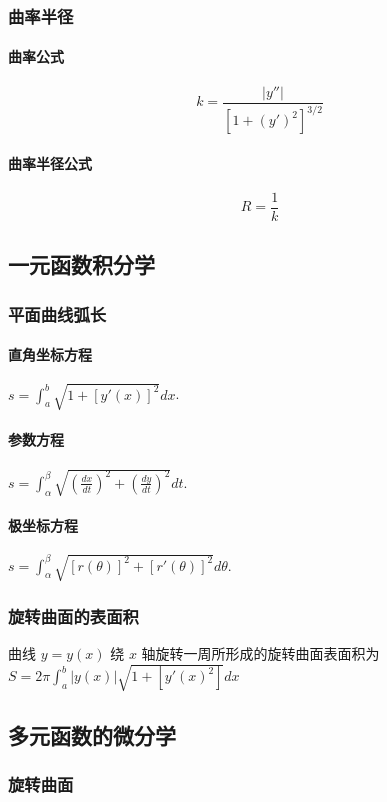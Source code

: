 ﻿\documentclass[a4paper,12pt,UTF8]{ctexart}
\begin{document}
    \subsubsection{曲率半径}
    \paragraph{曲率公式} \[k=\frac{|y''|}{[1+(y')^2]^{3/2}}\]
    \paragraph{曲率半径公式} \[R=\frac{1}{k}\]

    \subsection{一元函数积分学}

    \subsubsection{平面曲线弧长}
    \paragraph{直角坐标方程} \(s=\int_{a}^{b} \sqrt{1+[y'(x)]^2}dx \). 
    \paragraph{参数方程} \(s=\int_{\alpha}^{\beta} \sqrt{\left(\frac{dx}{dt}\right)^2+\left(\frac{dy}{dt}\right)^2}dt \).
    \paragraph{极坐标方程} \(s=\int_{\alpha}^{\beta} \sqrt{[r(\theta)]^2+[r'(\theta)]^2}d\theta \).

    \subsubsection{旋转曲面的表面积}
    曲线 \(y=y(x)\) 绕 \(x\) 轴旋转一周所形成的旋转曲面表面积为 \(S=2 \pi \int_{a}^{b} \left| y(x) \right| \sqrt{1+[y'(x)^2]}dx \) 

    \subsection{多元函数的微分学}

    \subsubsection{旋转曲面}
\end{document}
